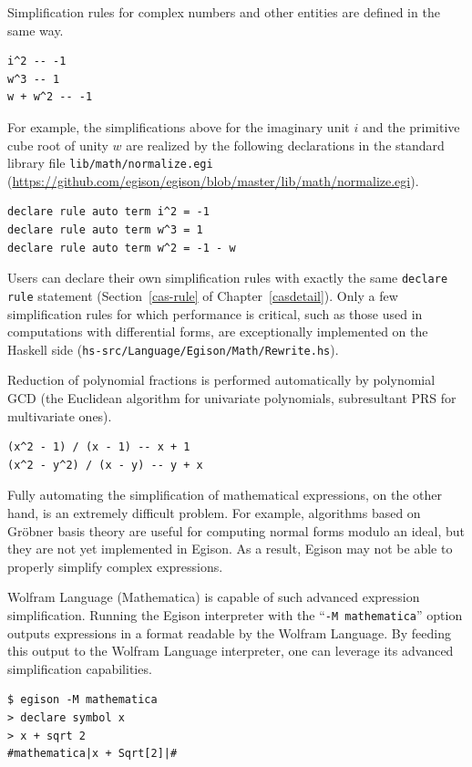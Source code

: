 Simplification rules for complex numbers and other entities are defined in the same way.
\begin{lstlisting}[language=egison,numbers=none]
i^2 -- -1
w^3 -- 1
w + w^2 -- -1
\end{lstlisting}
For example, the simplifications above for the imaginary unit $i$ and the primitive cube root of unity $w$ are realized by the following declarations in the standard library file \texttt{lib/math/normalize.egi} (\url{https://github.com/egison/egison/blob/master/lib/math/normalize.egi}).
\begin{lstlisting}[language=egison,numbers=none]
declare rule auto term i^2 = -1
declare rule auto term w^3 = 1
declare rule auto term w^2 = -1 - w
\end{lstlisting}
Users can declare their own simplification rules with exactly the same \lstinline{declare rule} statement (Section~\ref{cas-rule} of Chapter~\ref{casdetail}).
Only a few simplification rules for which performance is critical, such as those used in computations with differential forms, are exceptionally implemented on the Haskell side (\texttt{hs-src/Language/Egison/Math/Rewrite.hs}).

Reduction of polynomial fractions is performed automatically by polynomial GCD (the Euclidean algorithm for univariate polynomials, subresultant PRS for multivariate ones).
\begin{lstlisting}[language=egison,numbers=none]
(x^2 - 1) / (x - 1) -- x + 1
(x^2 - y^2) / (x - y) -- y + x
\end{lstlisting}
Fully automating the simplification of mathematical expressions, on the other hand, is an extremely difficult problem.
For example, algorithms based on Gr\"obner basis theory are useful for computing normal forms modulo an ideal, but they are not yet implemented in Egison.
As a result, Egison may not be able to properly simplify complex expressions.

Wolfram Language (Mathematica) is capable of such advanced expression simplification.
Running the Egison interpreter with the ``\texttt{-M mathematica}'' option outputs expressions in a format readable by the Wolfram Language.
By feeding this output to the Wolfram Language interpreter, one can leverage its advanced simplification capabilities.
\begin{lstlisting}[language=egison,numbers=none]
$ egison -M mathematica
> declare symbol x
> x + sqrt 2
#mathematica|x + Sqrt[2]|#
\end{lstlisting}

